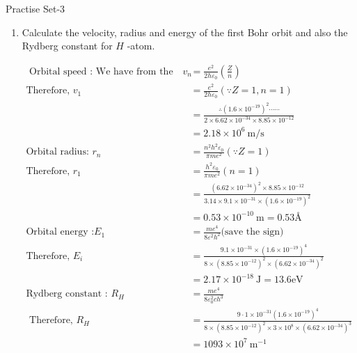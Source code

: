 \newpage
\begin{abox}
	Practise Set-3
\end{abox}
\begin{enumerate}[ label=\color{ocre}\textbf{\arabic*.}]
	\item 
	 Calculate the velocity, radius and energy of the first Bohr orbit and also the Rydberg constant for $H$ -atom.
	 \begin{answer}
	 	\begin{align*}
	 	\text{	Orbital speed : We have from the relation,}v_{n}&=\frac{e^{2}}{2 h\varepsilon_{0}}\left(\frac{Z}{n}\right) \\
	 	\text{Therefore, }v_{1}&=\frac{e^{2}}{2 h \varepsilon_{0}}(\because Z=1, n=1)\\&=\frac{\therefore\left(1.6 \times 10^{-19}\right)^{2} \cdots \cdots}{2 \times 6.62 \times 10^{-34} \times 8.85 \times 10^{-12}}\\&=2.18 \times 10^{6} \mathrm{~m} / \mathrm{s}\\
	 	\text{Orbital radius: }r_{n}&=\frac{n^{2} h^{2} \varepsilon_{0}}{\pi m e^{2}}(\because Z=1)\\
	 	\text{Therefore, }r_{1}&=\frac{h^{2} \varepsilon_{0}}{\pi m e^{2}}(n=1)\\&=\frac{\left(6.62 \times 10^{-34}\right)^{2} \times 8.85 \times 10^{-12}}{3.14 \times 9.1 \times 10^{-31} \times\left(1.6 \times 10^{-19}\right)^{2}}\\&=0.53 \times 10^{-10} \mathrm{~m}=0.53 \text{\AA}\\
	 	\text{Orbital energy :}E_{1}&=\frac{m e^{4}}{8 \varepsilon^{2} h^{2}} \text{(save the sign)}\\
	 	\text{Therefore, }E_{i}&=\frac{9.1 \times 10^{-31} \times\left(1.6 \times 10^{-19}\right)^{4}}{8 \times\left(8.85 \times 10^{-12}\right)^{2} \times\left(6.62 \times 10^{-34}\right)^{2}}\\&=2.17 \times 10^{-18} \mathrm{~J}=13.6 \mathrm{eV}\\
	 	\text{Rydberg constant : }R_{H}&=\frac{m e^{4}}{8 \varepsilon_{0}^{2} c h^{3}}\\
	 \text{	Therefore, }R_{H}&=\frac{9\cdot1 \times 10^{-31}\left( 1.6 \times 10^{-19}\right)^{4}}{8 \times\left(8.85 \times 10^{-12}\right)^{2} \times 3 \times 10^{8} \times\left(6.62 \times 10^{-34}\right)^{3}}\\&=1093 \times 10^{7} \mathrm{~m}^{-1}\\
	 	\end{align*}
	 \end{answer}

\end{enumerate}
